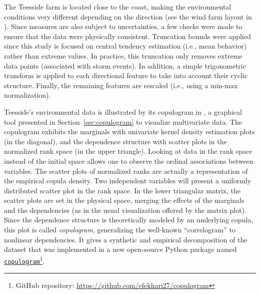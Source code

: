 
The Teesside farm is located close to the coast, making the environmental conditions very different depending on the direction (see the wind farm layout in ). 
Since measures are also subject to uncertainties, a few checks were made to ensure that the data were physically consistent. 
Truncation bounds were applied since this study is focused on central tendency estimation (i.e., mean behavior) rather than extreme values. 
In practice, this truncation only removes extreme data points (associated with storm events). 
In addition, a simple trigonometric transform is applied to each directional feature to take into account their cyclic structure. 
Finally, the remaining features are rescaled (i.e., using a min-max normalization). 

Teesside's environmental data is illustrated by its copulogram in , a graphical tool presented in Section~\ref{sec:copulogram} to visualize multivariate data. 
The copulogram exhibits the marginals with univariate kernel density estimation plots (in the diagonal), and the dependence structure with scatter plots in the normalized rank space (in the upper triangle). 
Looking at data in the rank space instead of the initial space allows one to observe the ordinal associations between variables. 
The scatter plots of normalized ranks are actually a representation of the empirical copula density.
Two independent variables will present a uniformly distributed scatter plot in the rank space. 
In the lower triangular matrix, the scatter plots are set in the physical space, merging the effects of the marginals and the dependencies (as in the usual visualization offered by the matrix plot). 
Since the dependence structure is theoretically modeled by an underlying copula, this plot is called \emph{copulogram}, generalizing the well-known ``correlogram'' to nonlinear dependencies. 
It gives a synthetic and empirical decomposition of the dataset that was implemented in a new open-source Python package named \texttt{\href{https://github.com/efekhari27/copulogram}{copulogram}}\footnote{GitHub repository: \url{https://github.com/efekhari27/copulogram}}.

